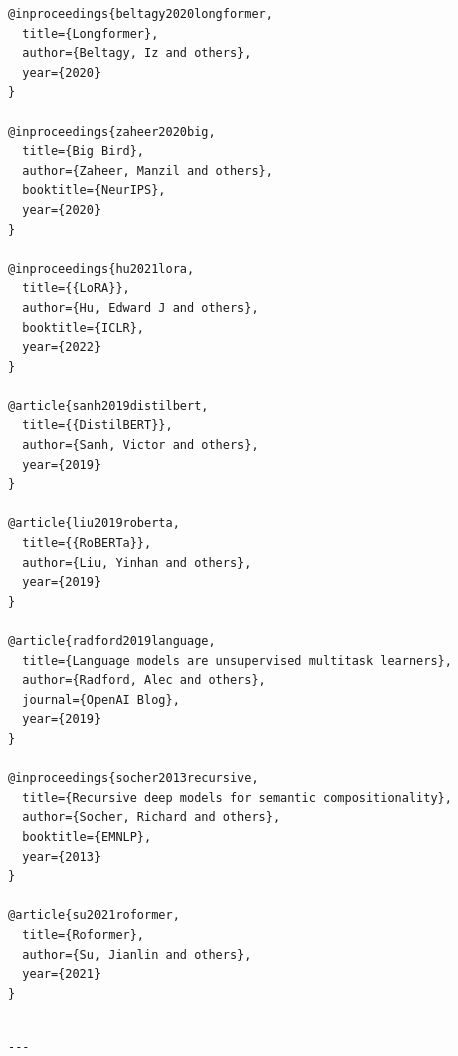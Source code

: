 \begin{lstlisting}
@inproceedings{beltagy2020longformer,
  title={Longformer},
  author={Beltagy, Iz and others},
  year={2020}
}

@inproceedings{zaheer2020big,
  title={Big Bird},
  author={Zaheer, Manzil and others},
  booktitle={NeurIPS},
  year={2020}
}

@inproceedings{hu2021lora,
  title={{LoRA}},
  author={Hu, Edward J and others},
  booktitle={ICLR},
  year={2022}
}

@article{sanh2019distilbert,
  title={{DistilBERT}},
  author={Sanh, Victor and others},
  year={2019}
}

@article{liu2019roberta,
  title={{RoBERTa}},
  author={Liu, Yinhan and others},
  year={2019}
}

@article{radford2019language,
  title={Language models are unsupervised multitask learners},
  author={Radford, Alec and others},
  journal={OpenAI Blog},
  year={2019}
}

@inproceedings{socher2013recursive,
  title={Recursive deep models for semantic compositionality},
  author={Socher, Richard and others},
  booktitle={EMNLP},
  year={2013}
}

@article{su2021roformer,
  title={Roformer},
  author={Su, Jianlin and others},
  year={2021}
}
\end{lstlisting}
\begin{lstlisting}

---
\end{lstlisting}